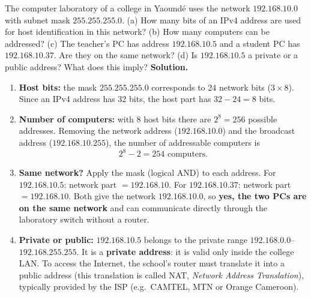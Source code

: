 \documentclass[11pt]{article}
\begin{document}
\begin{exoresolu}
The computer laboratory of a college in Yaoundé uses the network $192.168.10.0$ with subnet mask $255.255.255.0$. (a) How many bits of an IPv4 address are used for host identification in this network? (b) How many computers can be addressed? (c) The teacher's PC has address $192.168.10.5$ and a student PC has $192.168.10.37$. Are they on the same network? (d) Is $192.168.10.5$ a private or a public address? What does this imply?
\tcblower
\textbf{Solution.}
\begin{enumerate}
\item \textbf{Host bits:} the mask $255.255.255.0$ corresponds to 24 network bits ($3 \times 8$). Since an IPv4 address has 32 bits, the host part has $32 - 24 = 8$ bits.
\item \textbf{Number of computers:} with 8 host bits there are $2^8 = 256$ possible addresses. Removing the network address ($192.168.10.0$) and the broadcast address ($192.168.10.255$), the number of addressable computers is
\[ 2^8 - 2 = 254 \text{ computers.} \]
\item \textbf{Same network?} Apply the mask (logical AND) to each address. For $192.168.10.5$: network part $= 192.168.10$. For $192.168.10.37$: network part $= 192.168.10$. Both give the network $192.168.10.0$, so \textbf{yes, the two PCs are on the same network} and can communicate directly through the laboratory switch without a router.
\item \textbf{Private or public:} $192.168.10.5$ belongs to the private range $192.168.0.0$--$192.168.255.255$. It is a \textbf{private address}: it is valid only inside the college LAN. To access the Internet, the school's router must translate it into a public address (this translation is called NAT, \emph{Network Address Translation}), typically provided by the ISP (e.g.\ CAMTEL, MTN or Orange Cameroon).
\end{enumerate}
\end{exoresolu}
\end{document}
